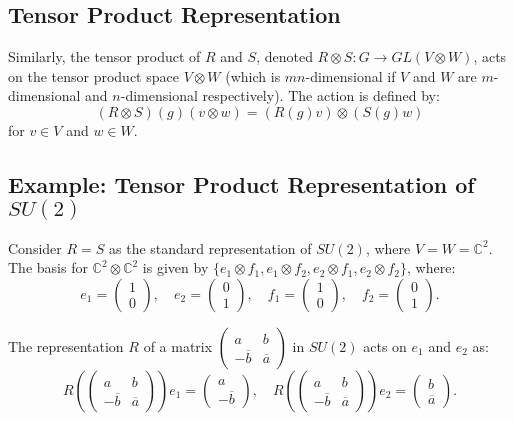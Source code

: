 \documentclass{article}
\begin{document}
\subsection*{Tensor Product Representation}
Similarly, the tensor product of \( R \) and \( S \), denoted \( R \otimes S: G \to GL(V \otimes W) \), acts on the tensor product space \( V \otimes W \) (which is \( mn \)-dimensional if \( V \) and \( W \) are \( m \)-dimensional and \( n \)-dimensional respectively). The action is defined by:
\[
(R \otimes S)(g)(v \otimes w) = (R(g)v) \otimes (S(g)w)
\]
for \( v \in V \) and \( w \in W \).

\subsection*{Example: Tensor Product Representation of \(SU(2)\)}
Consider \(R = S\) as the standard representation of \(SU(2)\), where \(V = W = \mathbb{C}^2\).
The basis for \(\mathbb{C}^2 \otimes \mathbb{C}^2\) is given by \( \{ e_1 \otimes f_1, e_1 \otimes f_2, e_2 \otimes f_1, e_2 \otimes f_2 \} \), where:
\[
e_1 = \begin{pmatrix} 1 \\ 0 \end{pmatrix}, \quad
e_2 = \begin{pmatrix} 0 \\ 1 \end{pmatrix}, \quad
f_1 = \begin{pmatrix} 1 \\ 0 \end{pmatrix}, \quad
f_2 = \begin{pmatrix} 0 \\ 1 \end{pmatrix}.
\]

The representation \(R\) of a matrix \(\begin{pmatrix} a & b \\ -\overline{b} & \overline{a} \end{pmatrix}\) in \(SU(2)\) acts on \(e_1\) and \(e_2\) as:
\[
R\left(\begin{pmatrix} a & b \\ -\overline{b} & \overline{a} \end{pmatrix}\right) e_1 = \begin{pmatrix} a \\ -\overline{b} \end{pmatrix}, \quad
R\left(\begin{pmatrix} a & b \\ -\overline{b} & \overline{a} \end{pmatrix}\right) e_2 = \begin{pmatrix} b \\ \overline{a} \end{pmatrix}.
\]
\end{document}
